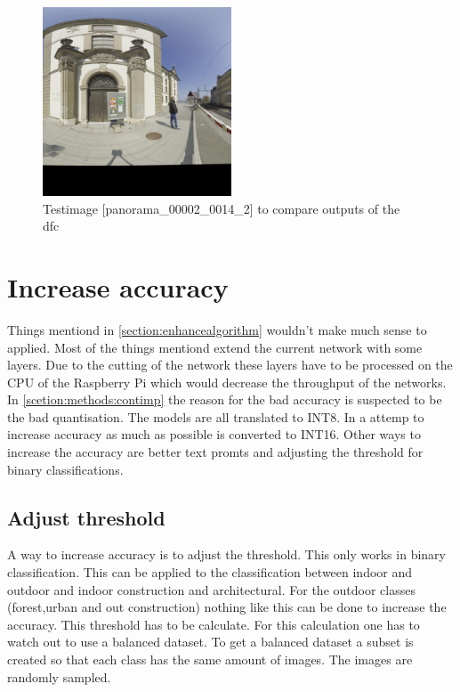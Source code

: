 \begin{figure}
    \centering
    \includegraphics[width=0.5\textwidth]{Images/Implementation/panorama_00002_0014_2_testIMg.jpg}
    \caption{Testimage [panorama\_00002\_0014\_2] to compare outputs of the \acrshort{dfc}}
    \label{methods:fig:comparetestpic}
\end{figure}

\section{Increase accuracy}

Things mentiond in \cref{section:enhancealgorithm} wouldn't make much sense to applied.
Most of the things mentiond extend the current network with some layers.
Due to the cutting of the network these layers have to be processed on the CPU of the Raspberry Pi which would decrease the throughput of the networks.
In \cref{scetion:methods:contimp} the reason for the bad accuracy is suspected to be the bad quantisation.
The models are all translated to INT8.
In a attemp to increase accuracy as much as possible is converted to INT16.
Other ways to increase the accuracy are better text promts and adjusting the threshold for binary classifications.

\subsection{Adjust threshold}

A way to increase accuracy is to adjust the threshold.
This only works in binary classification.
This can be applied to the classification between indoor and outdoor and indoor construction and architectural.
For the outdoor classes (forest,urban and out construction) nothing like this can be done to increase the accuracy.
This threshold has to be calculate.
For this calculation one has to watch out to use a balanced dataset.
To get a balanced dataset a subset is created so that each class has the same amount of images.
The images are randomly sampled.

